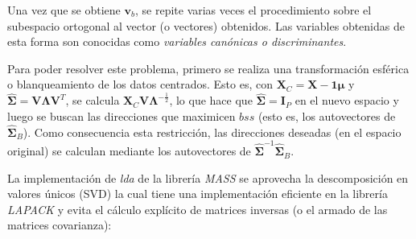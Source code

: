 \documentclass[12pt]{article}
\begin{document}
Una vez que se obtiene $\mathbf{v}_b$, se repite varias veces el procedimiento sobre el subespacio ortogonal al vector (o vectores) obtenidos. Las variables obtenidas de esta forma son conocidas como \textit{variables canónicas o discriminantes}.

Para poder resolver este problema, primero se realiza una transformación esférica o blanqueamiento de los datos centrados. Esto es, con $\mathbf{X}_C = \mathbf{X} - \mathbf{1}\boldsymbol{\mu}$ y $\hat{\boldsymbol{\Sigma}} = \mathbf{V} \boldsymbol{\Lambda} \mathbf{V}^T$, se calcula $\mathbf{X}_C \mathbf{V} \boldsymbol{\Lambda}^{-\frac{1}{2}}$, lo que hace que $\hat{\boldsymbol{\Sigma}} = \mathbf{I}_P$ en el nuevo espacio y luego se buscan las direcciones que maximicen $bss$ (esto es, los autovectores de $\hat{\boldsymbol{\Sigma}}_B$). Como consecuencia esta restricción, las direcciones deseadas (en el espacio original) se calculan mediante los autovectores de $\hat{\boldsymbol{\Sigma}}^{-1}\hat{\boldsymbol{\Sigma}}_B$.



La implementación de \textit{lda} de la librería \textit{MASS} se aprovecha la descomposición en valores únicos (SVD) la cual tiene una implementación eficiente en la librería \textit{LAPACK} y evita el cálculo explícito de matrices inversas (o el armado de las matrices covarianza): 
\end{document}
